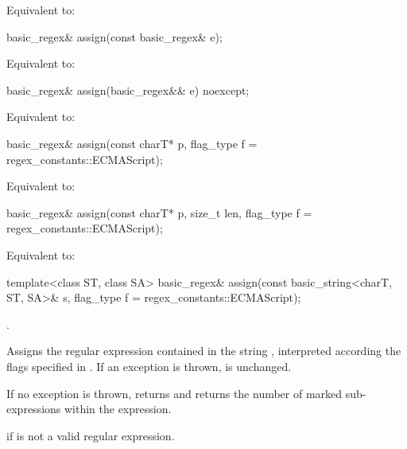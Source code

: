 \begin{itemdescr}
\pnum
\effects
Equivalent to: 
\end{itemdescr}

%
\begin{itemdecl}
basic_regex& assign(const basic_regex& e);
\end{itemdecl}

\begin{itemdescr}
\pnum
\effects
Equivalent to: 
\end{itemdescr}

%
\begin{itemdecl}
basic_regex& assign(basic_regex&& e) noexcept;
\end{itemdecl}

\begin{itemdescr}
\pnum
\effects
Equivalent to: 
\end{itemdescr}

%
\begin{itemdecl}
basic_regex& assign(const charT* p, flag_type f = regex_constants::ECMAScript);
\end{itemdecl}

\begin{itemdescr}
\pnum
\effects
Equivalent to: 
\end{itemdescr}

%
\begin{itemdecl}
basic_regex& assign(const charT* p, size_t len, flag_type f = regex_constants::ECMAScript);
\end{itemdecl}

\begin{itemdescr}
\pnum
\effects
Equivalent to: 
\end{itemdescr}

%
\begin{itemdecl}
template<class ST, class SA>
  basic_regex& assign(const basic_string<charT, ST, SA>& s,
                      flag_type f = regex_constants::ECMAScript);
\end{itemdecl}

\begin{itemdescr}
\pnum
\returns
{}.

\pnum
\effects
Assigns the regular expression contained in the string
, interpreted according the flags specified in .
If an exception is thrown,  is unchanged.

\pnum
\ensures
If no exception is thrown,
 returns  and 
returns the number of marked sub-expressions within the expression.

\pnum
\throws
{} if  is not a valid regular expression.
\end{itemdescr}

